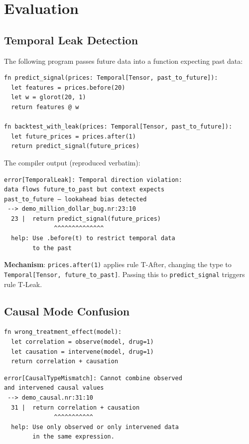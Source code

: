 \documentclass[11pt,a4paper]{article}
\newcommand{\ty}[1]{\texttt{#1}}
\begin{document}

\section{Evaluation}

\subsection{Temporal Leak Detection}

The following program passes future data into a function expecting past data:

\begin{lstlisting}
fn predict_signal(prices: Temporal[Tensor, past_to_future]):
  let features = prices.before(20)
  let w = glorot(20, 1)
  return features @ w

fn backtest_with_leak(prices: Temporal[Tensor, past_to_future]):
  let future_prices = prices.after(1)
  return predict_signal(future_prices)
\end{lstlisting}

The compiler output (reproduced verbatim):

\begin{Verbatim}[fontsize=\small,frame=single]
error[TemporalLeak]: Temporal direction violation:
data flows future_to_past but context expects
past_to_future — lookahead bias detected
 --> demo_million_dollar_bug.nr:23:10
  23 |  return predict_signal(future_prices)
              ^^^^^^^^^^^^^^
  help: Use .before(t) to restrict temporal data
        to the past
\end{Verbatim}

\textbf{Mechanism}: \ty{prices.after(1)} applies rule T-After, changing the type to \ty{Temporal[Tensor, future\_to\_past]}. Passing this to \ty{predict\_signal} triggers rule T-Leak.

\subsection{Causal Mode Confusion}

\begin{lstlisting}
fn wrong_treatment_effect(model):
  let correlation = observe(model, drug=1)
  let causation = intervene(model, drug=1)
  return correlation + causation
\end{lstlisting}

\begin{Verbatim}[fontsize=\small,frame=single]
error[CausalTypeMismatch]: Cannot combine observed
and intervened causal values
 --> demo_causal.nr:31:10
  31 |  return correlation + causation
              ^^^^^^^^^^^
  help: Use only observed or only intervened data
        in the same expression.
\end{Verbatim}
\end{document}

